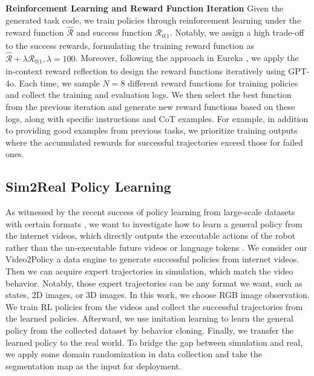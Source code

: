 \textbf{Reinforcement Learning and Reward Function Iteration} 
Given the generated task code, we train policies through reinforcement learning under the reward function $\hat{\mathcal{R}}$ and success function $\mathcal{R}_{0|1}$. Notably, we assign a high trade-off to the success rewards, formulating the training reward function as $\hat{\mathcal{R}} + \lambda \mathcal{R}_{0|1}, \lambda = 100$. Moreover, following the approach in Eureka \citep{ma2023eureka}, we apply the in-context reward reflection to design the reward functions iteratively using GPT-4o. Each time, we sample $N=8$ different reward functions for training policies and collect the training and evaluation logs. We then select the best function from the previous iteration and generate new reward functions based on these logs, along with specific instructions and CoT examples. For example, in addition to providing good examples from previous tasks, we prioritize training outputs where the accumulated rewards for successful trajectories exceed those for failed ones. 


\subsection{Sim2Real Policy Learning}
\label{sec:method:general}

As witnessed by the recent success of policy learning from large-scale datasets with certain formats \citep{padalkar2023open, reed2022generalist, team2024octo, brohan2023can}, we want to investigate how to learn a general policy from the internet videos, which directly outputs the executable actions of the robot rather than the un-executable future videos \citep{du2024learning, qin2023unicontrol} or language tokens \citep{liang2023code, brohan2023can}. We consider our Video2Policy a data engine to generate successful policies from internet videos. Then we can acquire expert trajectories in simulation, which match the video behavior. Notably, those expert trajectories can be any format we want, such as states, 2D images, or 3D images. In this work, we choose RGB image observation. We train RL policies from the videos and collect the successful trajectories from the learned policies. Afterward, we use imitation learning to learn the general policy from the collected dataset by behavior cloning. Finally, we transfer the learned policy to the real world. To bridge the gap between simulation and real, we apply some domain randomization in data collection and take the segmentation map as the input for deployment.
